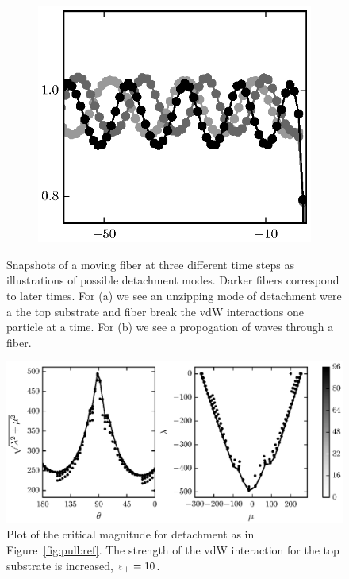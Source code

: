 \begin{figure}[t]
\begin{subfigure}{.5\textwidth}
         \includegraphics{./fig/ch3/pull/wave_anim.eps}
         \caption{\label{subfig:travel_waves}}
      \end{subfigure}
      \caption{Snapshots of a moving fiber at three different time steps as illustrations of possible detachment modes. Darker fibers correspond to later times. For (a) we see an unzipping mode of detachment were a the top substrate and fiber break the vdW interactions one particle at a time. For (b) we see a propogation of waves through a fiber.\label{fig:animation}}  
   \end{figure}

   \begin{figure}[t]
      \begin{center}
         \includegraphics{./fig/ch3/pull/et10/grid.eps}
      \end{center}      
      \caption{Plot of the critical magnitude for detachment as in Figure~\ref{fig:pull:ref}. The strength of the vdW interaction for the top substrate is increased, $\varepsilon_+=10$.
      \label{fig:pull:et10}}
   \end{figure}

